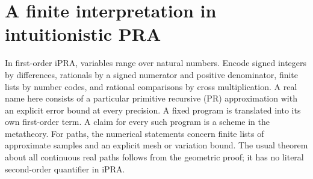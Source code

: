 \documentclass[10pt,letterpaper]{article}
\begin{document}
\section{A finite interpretation in intuitionistic PRA}\label{sec:arith}
In first-order iPRA, variables range over natural numbers. Encode signed integers by differences, rationals by a signed numerator and positive denominator, finite lists by number codes, and rational comparisons by cross multiplication. A real name here consists of a particular primitive recursive (PR) approximation with an explicit error bound at every precision. A fixed program is translated into its own first-order term. A claim for every such program is a scheme in the metatheory. For paths, the numerical statements concern finite lists of approximate samples and an explicit mesh or variation bound. The usual theorem about all continuous real paths follows from the geometric proof; it has no literal second-order quantifier in iPRA.

\end{document}
